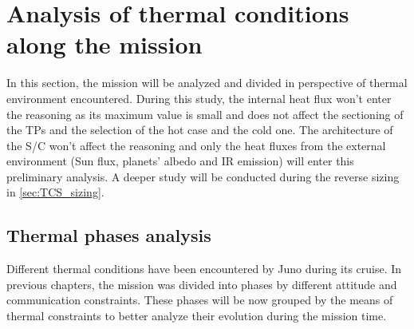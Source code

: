 \section{Analysis of thermal conditions along the mission}
\label{sec:TCS_phases}

In this section, the mission will be analyzed and divided in perspective of thermal environment encountered. During this study, the internal heat flux won't enter the reasoning as its maximum value is small and does not affect the sectioning of the TPs and the selection of the hot case and the cold one.
The architecture of the S/C won't affect the reasoning and only the heat fluxes from the external environment (Sun flux, planets' albedo and IR emission) will enter this preliminary analysis. A deeper study will be conducted during the reverse sizing in \autoref{sec:TCS_sizing}.

\subsection{Thermal phases analysis}
\label{subsec:TP_analysis}

Different thermal conditions have been encountered by Juno during its cruise. In previous chapters, the mission was divided into phases by different attitude and communication constraints. These phases will be now grouped by the means of thermal constraints to better analyze their evolution during the mission time.

